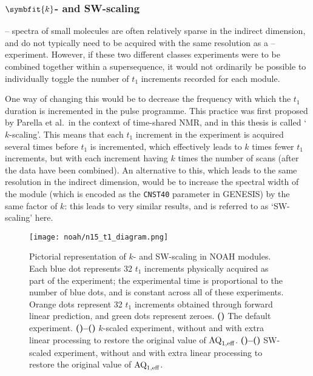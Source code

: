 \subsubsection{$\symbfit{k}$- and SW-scaling}

\proton{}--\nitrogen{} spectra of small molecules are often relatively sparse in the indirect dimension, and do not typically need to be acquired with the same resolution as a \proton{}--\carbon{} experiment.
However, if these two different classes experiments were to be combined together within a supersequence, it would not ordinarily be possible to individually toggle the number of $t_1$ increments recorded for each module.

One way of changing this would be to decrease the frequency with which the \nitrogen{} $t_1$ duration is incremented in the pulse programme.
This practice was first proposed by Parella et al.\ in the context of time-shared NMR\autocite{PerezTrujillo2007MRC,Parella2010CMR}, and in this thesis is called `$k$-scaling'.
This means that each $t_1$ increment in the \nitrogen{} experiment is acquired several times before $t_1$ is incremented, which effectively leads to $k$ times fewer $t_1$ increments, but with each increment having $k$ times the number of scans (after the data have been combined).
An alternative to this, which leads to the same resolution in the indirect dimension, would be to increase the spectral width of the \nitrogen{} module (which is encoded as the \texttt{CNST40} parameter in GENESIS) by the same factor of $k$: this leads to very similar results, and is referred to as `SW-scaling' here.

\begin{figure}[!ht]
    \centering
    \texttt{[image: noah/n15\_t1\_diagram.png]}%
    {\label{fig:n15_t1_normal}}%
    {\label{fig:n15_t1_k}}%
    {\label{fig:n15_t1_k_lp}}%
    {\label{fig:n15_t1_sw}}%
    {\label{fig:n15_t1_sw_lp}}%
    \caption[Pictorial representation of $k$- and SW-scaling in NOAH \nitrogen{} modules]{
        Pictorial representation of $k$- and SW-scaling in NOAH \nitrogen{} modules.
        Each blue dot represents 32 $t_1$ increments physically acquired as part of the experiment; the experimental time is proportional to the number of blue dots, and is constant across all of these experiments.
        Orange dots represent 32 $t_1$ increments obtained through forward linear prediction, and green dots represent zeroes.
        \textbf{()} The default experiment.
        \textbf{()--()} $k$-scaled experiment, without and with extra linear processing to restore the original value of $\text{AQ}_{1,\text{eff}}$.
        \textbf{()--()} SW-scaled experiment, without and with extra linear processing to restore the original value of $\text{AQ}_{1,\text{eff}}$.
    }
    \label{fig:n15_t1}
\end{figure}

